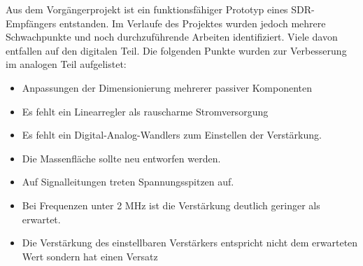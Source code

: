 Aus dem Vorgängerprojekt ist ein funktionsfähiger Prototyp eines SDR-Empfängers entstanden. Im Verlaufe des Projektes wurden jedoch mehrere Schwachpunkte und noch durchzuführende Arbeiten identifiziert. Viele davon entfallen auf den digitalen Teil. Die folgenden Punkte wurden zur Verbesserung im analogen Teil aufgelistet:

\begin{itemize}
	\item Anpassungen der Dimensionierung mehrerer passiver Komponenten
	\item Es fehlt ein Linearregler als rauscharme Stromversorgung
	\item Es fehlt ein Digital-Analog-Wandlers zum Einstellen der Verstärkung.
	\item Die Massenfläche sollte neu entworfen werden.
	\item Auf Signalleitungen treten Spannungsspitzen auf.
	\item Bei Frequenzen unter 2 MHz ist die Verstärkung deutlich geringer als erwartet.
	\item Die Verstärkung des einstellbaren Verstärkers entspricht nicht dem erwarteten Wert sondern hat einen Versatz
\end{itemize}
